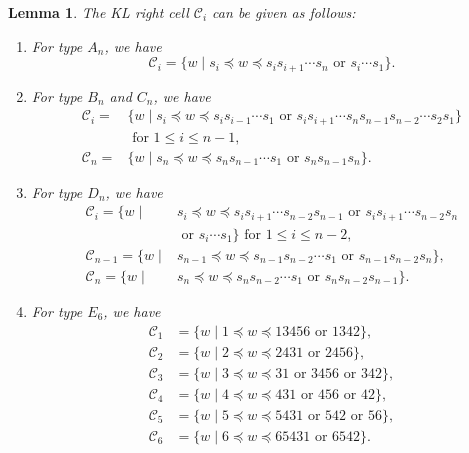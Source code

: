 \documentclass[11pt, reqno]{amsart}
\newtheorem{lem}[Thm]{Lemma}
\theoremstyle{definition}
\numberwithin{equation}{section}
\begin{document}
\begin{lem}\label{rightcell-ci}
    The KL right cell $\mathcal{C}_i$ can be given as follows:
\begin{enumerate}
    \item For type $A_{n}$, we have 
    $$\mathcal{C}_i=\{w\mid s_i\preceq w \preceq s_is_{i+1}\cdots s_{n}\text{ or }s_i\cdots s_1\}.$$

\item For type $B_{n}$ and $C_n$, we have 
    \begin{align*}
    \mathcal{C}_i=&\{w\mid s_i\preceq w\preceq s_is_{i-1}\cdots s_1 \text{~or~} s_is_{i+1}\cdots s_{n}s_{n-1}s_{n-2}\cdots s_{2}s_1\}\\
    &\text{~for~} 1\leq i\leq n-1,\\
    \mathcal{C}_n=&\{w\mid s_n\preceq w\preceq s_ns_{n-1}\cdots s_1 \text{~or~} s_ns_{n-1}s_{n}\}.
    \end{align*}





\item For type $D_{n}$, we have 
    \begin{align*}
        \mathcal{C}_i=\{ w\mid &s_i\preceq w\preceq s_is_{i+1}\cdots s_{n-2} s_{n-1} \text{~or~} s_is_{i+1}\cdots s_{n-2} s_{n}\\
        &\text{~or~} s_i\cdots s_1\} \text{~for~} 1\leq i\leq n-2,\\
        \mathcal{C}_{n-1}=\{w\mid & s_{n-1}\preceq w\preceq   s_{n-1}s_{n-2}\cdots s_{1}\text{~or~}s_{n-1}s_{n-2}s_n\},\\
        \mathcal{C}_{n}=\{w\mid &s_{n}\preceq w\preceq s_{n}s_{n-2}\cdots s_{1} \text{~or~}s_{n}s_{n-2}s_{n-1}\}.
    \end{align*}
\item For type $E_{6}$, we have 
\begin{align*}
\mathcal{C}_1&=\{ w\mid 1\preceq w\preceq 13456 \text{ or }1342 \},\\
\mathcal{C}_2&=\{ w\mid 2\preceq w\preceq 2431 \text{ or }2456 \},\\
\mathcal{C}_3&=\{ w\mid 3\preceq w\preceq 31 \text{ or }3456 \text{ or }342  \},\\
\mathcal{C}_4&=\{ w\mid 4\preceq w\preceq 431 \text{ or }456 \text{ or }42 \},\\
\mathcal{C}_5&=\{ w\mid 5\preceq w\preceq 5431 \text{ or }542 \text{ or }56 \},\\
\mathcal{C}_6&=\{ w\mid 6\preceq w\preceq 65431 \text{ or }6542 \}.
\end{align*}




\end{enumerate}
\end{lem}
\end{document}
